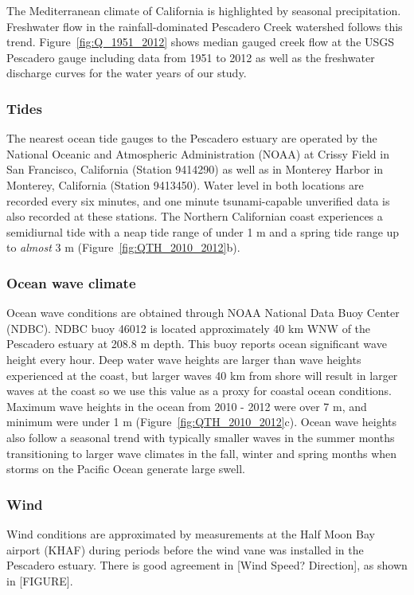 {The Mediterranean climate of California is highlighted by seasonal precipitation. Freshwater flow in the rainfall-dominated Pescadero Creek watershed follows this trend. Figure~\ref{fig:Q_1951_2012} shows median gauged creek flow at the USGS Pescadero gauge including data from 1951 to 2012 as well as the freshwater discharge curves for the water years of our study. 



\subsubsection{Tides}
The nearest ocean tide gauges to the Pescadero estuary are operated by the National Oceanic and Atmospheric Administration (NOAA) at Crissy Field in San Francisco, California (Station 9414290) as well as in Monterey Harbor in Monterey, California (Station 9413450). Water level in both locations are recorded every six minutes, and one minute tsunami-capable unverified data is also recorded at these stations. The Northern Californian coast experiences a semidiurnal tide with a neap tide range of under 1 m and a spring tide range up to \emph{almost} 3 m (Figure~\ref{fig:QTH_2010_2012}b). 

\subsubsection{Ocean wave climate}
Ocean wave conditions are obtained through NOAA National Data Buoy Center (NDBC). NDBC buoy 46012 is located approximately 40 km WNW of the Pescadero estuary at 208.8 m depth. This buoy reports ocean significant wave height every hour. Deep water wave heights are larger than wave heights experienced at the coast, but larger waves 40 km from shore will result in larger waves at the coast so we use this value as a proxy for coastal ocean conditions. Maximum wave heights in the ocean from 2010 - 2012 were over 7 m, and minimum were under 1 m (Figure~\ref{fig:QTH_2010_2012}c). Ocean wave heights also follow a seasonal trend with typically smaller waves in the summer months transitioning to larger wave climates in the fall, winter and spring months when storms on the Pacific Ocean generate large swell.

\subsubsection{Wind}
Wind conditions are approximated by measurements at the Half Moon Bay airport (KHAF) during periods before the wind vane was installed in the Pescadero estuary.  There is good agreement in [Wind Speed? Direction], as shown in [FIGURE].

}
